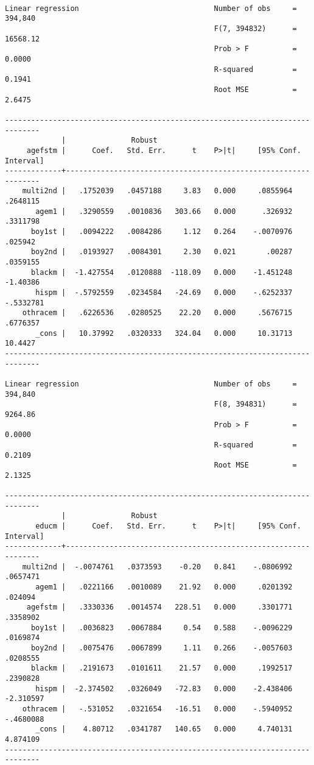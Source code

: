 \documentclass[cache=false]{article}
\begin{document}
\begin{verbatim}

Linear regression                               Number of obs     =    394,840
                                                F(7, 394832)      =   16568.12
                                                Prob > F          =     0.0000
                                                R-squared         =     0.1941
                                                Root MSE          =     2.6475

------------------------------------------------------------------------------
             |               Robust
     agefstm |      Coef.   Std. Err.      t    P>|t|     [95% Conf. Interval]
-------------+----------------------------------------------------------------
    multi2nd |   .1752039   .0457188     3.83   0.000     .0855964    .2648115
       agem1 |   .3290559   .0010836   303.66   0.000      .326932    .3311798
      boy1st |   .0094222   .0084286     1.12   0.264    -.0070976     .025942
      boy2nd |   .0193927   .0084301     2.30   0.021       .00287    .0359155
      blackm |  -1.427554   .0120888  -118.09   0.000    -1.451248    -1.40386
       hispm |  -.5792559   .0234584   -24.69   0.000    -.6252337   -.5332781
    othracem |   .6226536   .0280525    22.20   0.000     .5676715    .6776357
       _cons |   10.37992   .0320333   324.04   0.000     10.31713     10.4427
------------------------------------------------------------------------------

Linear regression                               Number of obs     =    394,840
                                                F(8, 394831)      =    9264.86
                                                Prob > F          =     0.0000
                                                R-squared         =     0.2109
                                                Root MSE          =     2.1325

------------------------------------------------------------------------------
             |               Robust
       educm |      Coef.   Std. Err.      t    P>|t|     [95% Conf. Interval]
-------------+----------------------------------------------------------------
    multi2nd |  -.0074761   .0373593    -0.20   0.841    -.0806992    .0657471
       agem1 |   .0221166   .0010089    21.92   0.000     .0201392     .024094
     agefstm |   .3330336   .0014574   228.51   0.000     .3301771    .3358902
      boy1st |   .0036823   .0067884     0.54   0.588    -.0096229    .0169874
      boy2nd |   .0075476   .0067899     1.11   0.266    -.0057603    .0208555
      blackm |   .2191673   .0101611    21.57   0.000     .1992517    .2390828
       hispm |  -2.374502   .0326049   -72.83   0.000    -2.438406   -2.310597
    othracem |   -.531052   .0321654   -16.51   0.000    -.5940952   -.4680088
       _cons |    4.80712   .0341787   140.65   0.000     4.740131    4.874109
------------------------------------------------------------------------------


\end{verbatim}
\end{document}
